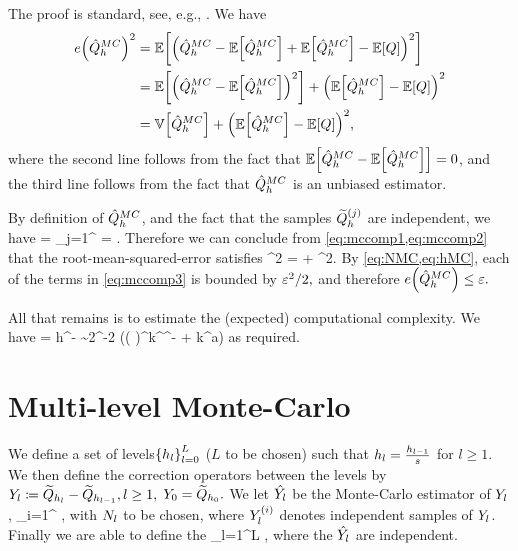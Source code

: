 The proof is standard, see, e.g., \cite[Section 2.1]{ClGiScTe:11}. We have
\begin{align}
\err{\QhatMC}^2 &= \EXP{\mleft(\QhatMC - \EXP{\QhatMC} + \EXP{\QhatMC} - \EXP{Q}\mright)^2}\nonumber\\
&= \EXP{\mleft(\QhatMC - \EXP{\QhatMC}\mright)^2} + \mleft(\EXP{\QhatMC} - \EXP{Q}\mright)^2\nonumber\\
&= \VAR{\QhatMC} + \mleft(\EXP{\QhatMC} - \EXP{Q}\mright)^2,\label{eq:mccomp1}
\end{align}
where the second line follows from the fact that $\EXP{\QhatMC - \EXP{\QhatMC}} = 0$, and the third line follows from the fact that $\hat{Q}^{MC}_{h}$ is an unbiased estimator.

By definition of $\hat{Q}^{MC}_{h}$, and the fact that the samples $\widetilde{Q}_{h}^{(j)}$ are independent, we have
\beq\label{eq:mccomp2}
\VAR{\QhatMC} = \sum_{j=1}^{\NMC}\VAR{\Qhtildesj} =  \VAR{\Qhtilde}.
\eeq
Therefore we can conclude from \cref{eq:mccomp1,eq:mccomp2} that the root-mean-squared-error satisfies
\beq\label{eq:mccomp3}
\err{\QhatMC}^2 = \VAR{\Qhtilde} + ^2.
\eeq
By \cref{eq:NMC,eq:hMC}, each of the terms in \cref{eq:mccomp3} is bounded by  $\varepsilon^2/2,$ and therefore $\err{\QhatMC} \leq \eps.$

All that remains is to estimate the (expected) computational complexity. We have
\beqs
\EXP{\Cost{\QhatMC}} = \NMC \EXP{\Cost{\uhtilde}} \leq \NMC \cth h^{-\gamma} \sim 2\VAR{\Qhtilde}\eps^{-2} \mleft(\cth \mleft( \co\mright)^{\frac\gamma\alpha}k^{\frac{\gamma\sigma}{\alpha}}\eps^{-\frac\gamma\alpha} + k^{a\gamma}\mright)
\eeqs
as required.
\epf

\section{Multi-level Monte-Carlo}

We define a set of levels$\set{\hl}_{l=0}^L$ ($L$ to be chosen) such that $h_{l} =\frac{h_{l-1}}s$ for $l \geq 1$. We then define the correction operators between the levels by $Y_{l} \coloneqq \widetilde{Q}_{h_{l}} - \widetilde{Q}_{h_{l-1}}, l \geq 1,$ $Y_{0} = \widetilde{Q}_{h_{0}}.$ We let $\hat{Y_{l}}$ be the Monte-Carlo estimator of $Y_{l}$,
 \beqs
\Ylhat \de {}\sum_{i=1}^{\Nl} \Yli,
 \eeqs
 with $N_{l}$ to be chosen, where $Y_{l}^{(i)}$ denotes independent samples of $Y_{l}$. Finally we are able to define the 
 \beqs
 \QhatMLhL \de \sum_{l=1}^L \Ylhat,
 \eeqs
 where the $\hat{Y_{l}}$ are independent.

